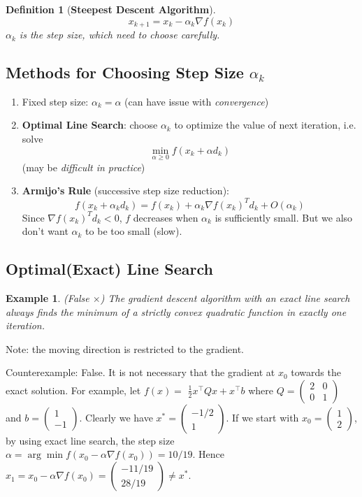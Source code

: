 \documentclass[11pt,a4paper]{article}
\newtheorem{example}{Example}
\newtheorem{definition}{Definition}
\begin{document}
\begin{definition}[\textbf{Steepest Descent Algorithm}]
$$x_{k+1}=x_k-\alpha_k \nabla f(x_k)$$
$\alpha_k$ is the step size, which need to choose carefully.
\end{definition}

\subsection{Methods for Choosing Step Size $\alpha_k$}
\begin{enumerate}[Method (1):]
    \item Fixed step size: $\alpha_k=\alpha$ (can have issue with \textit{convergence})
    \item \textbf{Optimal Line Search}: choose $\alpha_k$ to optimize the value of next iteration, i.e. solve $$\min_{\alpha\geq 0}f(x_k+\alpha d_k)$$ (may be \textit{difficult in practice})
    \item \textbf{Armijo's Rule} (successive step size reduction):$$f(x_k+\alpha_k d_k)=f(x_k)+\alpha_k \nabla f(x_k)^T d_k+O(\alpha_k)$$
    Since $\nabla f(x_k)^T d_k<0$, $f$ decreases when $\alpha_k$ is sufficiently small. But we also don't want $\alpha_k$ to be too small (slow).
\end{enumerate}

\subsection*{Optimal(Exact) Line Search}
\begin{example}
    (False $\times$) The gradient descent algorithm with an exact line search always finds the minimum of a strictly convex quadratic function in exactly one iteration.
\end{example}
Note: the moving direction is restricted to the gradient.

Counterexample: False. It is not necessary that the gradient at $x_{0}$ towards the exact solution. For example, let $f(x)=$ $\frac{1}{2} x^{\top} Q x+x^{\top} b$ where $Q=\left(\begin{array}{ll}2 & 0 \\ 0 & 1\end{array}\right)$ and $b=\left(\begin{array}{c}1 \\ -1\end{array}\right)$. Clearly we have $x^{*}=\left(\begin{array}{c}-1 / 2 \\ 1\end{array}\right)$. If we start with $x_{0}=\left(\begin{array}{l}1 \\ 2\end{array}\right)$, by using exact line search, the step size $\alpha=\arg \min f\left(x_{0}-\alpha \nabla f\left(x_{0}\right)\right)=10 / 19$. Hence $x_{1}=x_{0}-\alpha \nabla f\left(x_{0}\right)=\left(\begin{array}{c}-11 / 19 \\ 28 / 19\end{array}\right) \neq x^{*}$.
\end{document}
